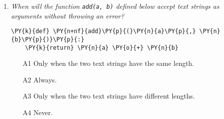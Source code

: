 \begin{enumerate}
\begin{enumerate}
\item[A1] 
\begin{Verbatim}[commandchars=\\\{\}]
\PY{k}{def} \PY{n+nf}{subtract}\PY{p}{(}\PY{n}{a}\PY{p}{,} \PY{n}{b}\PY{p}{)}
    \PY{k}{return} \PY{n}{a} \PY{o}{-} \PY{n}{b}
\end{Verbatim}
\item[A2] 
\begin{Verbatim}[commandchars=\\\{\}]
\PY{k}{def} \PY{n+nf}{subtract}\PY{p}{(}\PY{n}{a}\PY{p}{,} \PY{n}{b}\PY{p}{)}\PY{p}{:}
    \PY{k}{return} \PY{n}{a} \PY{o}{-} \PY{n}{b}
\end{Verbatim}
\item[A3] 
\begin{Verbatim}[commandchars=\\\{\}]
\PY{k}{def} \PY{n+nf}{subtract}\PY{p}{[}\PY{n}{a}\PY{p}{,} \PY{n}{b}\PY{p}{]}
    \PY{k}{return} \PY{n}{a} \PY{o}{-} \PY{n}{b}
\end{Verbatim}
\item[A4] 
\begin{Verbatim}[commandchars=\\\{\}]
\PY{k}{def} \PY{n+nf}{subtract}\PY{p}{(}\PY{n}{a}\PY{p}{,} \PY{n}{b} \PY{o}{=} \PY{l+m+mi}{5}\PY{p}{)}\PY{p}{:}
    \PY{k}{return} \PY{n}{a} \PY{o}{-} \PY{n}{b}
\end{Verbatim}
\end{enumerate}

\vspace{6mm}

\item {\em When will the function {\tt add(a, b)} defined below accept text strings 
as arguments without throwing an error?}\\

\begin{Verbatim}[commandchars=\\\{\}]
\PY{k}{def} \PY{n+nf}{add}\PY{p}{(}\PY{n}{a}\PY{p}{,} \PY{n}{b}\PY{p}{)}\PY{p}{:}
    \PY{k}{return} \PY{n}{a} \PY{o}{+} \PY{n}{b}
\end{Verbatim}
\vspace{6mm}

\begin{enumerate}
\item[A1] Only when the two text strings have the same length. 
\item[A2] Always.
\item[A3] Only when the two text strings have different lengths.
\item[A4] Never.
\end{enumerate}


\end{enumerate}
